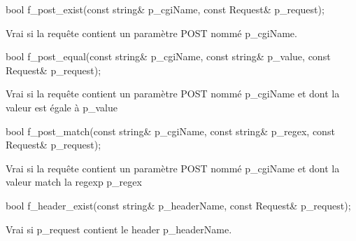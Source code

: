 \begin{DoxyItemize}
\item 
\begin{DoxyCode}
\textcolor{keywordtype}{bool} f\_post\_exist(\textcolor{keyword}{const} \textcolor{keywordtype}{string}& p\_cgiName, \textcolor{keyword}{const} Request& p\_request); 
\end{DoxyCode}
 Vrai si la requête contient un paramètre P\-O\-S\-T nommé p\-\_\-cgi\-Name. \par
\par
 \par
\par

\item 
\begin{DoxyCode}
\textcolor{keywordtype}{bool} f\_post\_equal(\textcolor{keyword}{const} \textcolor{keywordtype}{string}& p\_cgiName, \textcolor{keyword}{const} \textcolor{keywordtype}{string}& p\_value, \textcolor{keyword}{const} Request& p\_request); 
\end{DoxyCode}
 \par
\par
 Vrai si la requête contient un paramètre P\-O\-S\-T nommé p\-\_\-cgi\-Name et dont la valeur est égale à p\-\_\-value \par
\par

\item 
\begin{DoxyCode}
\textcolor{keywordtype}{bool} f\_post\_match(\textcolor{keyword}{const} \textcolor{keywordtype}{string}& p\_cgiName, \textcolor{keyword}{const} \textcolor{keywordtype}{string}& p\_regex, \textcolor{keyword}{const} Request& p\_request); 
\end{DoxyCode}
 \par
\par
 Vrai si la requête contient un paramètre P\-O\-S\-T nommé p\-\_\-cgi\-Name et dont la valeur match la regexp p\-\_\-regex \par
\par

\item 
\begin{DoxyCode}
\textcolor{keywordtype}{bool} f\_header\_exist(\textcolor{keyword}{const} \textcolor{keywordtype}{string}& p\_headerName, \textcolor{keyword}{const} Request& p\_request); 
\end{DoxyCode}
 Vrai si p\-\_\-request contient le header p\-\_\-header\-Name. \par
\par
 \par
\par


\end{DoxyItemize}
